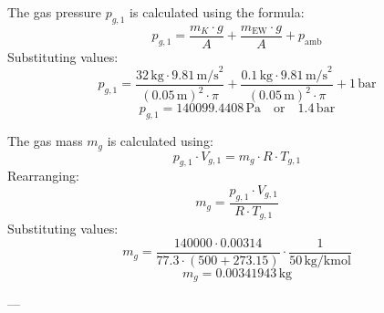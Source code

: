 The gas pressure \( p_{g,1} \) is calculated using the formula:  
\[
p_{g,1} = \frac{m_K \cdot g}{A} + \frac{m_{\text{EW}} \cdot g}{A} + p_{\text{amb}}
\]  
Substituting values:  
\[
p_{g,1} = \frac{32 \, \text{kg} \cdot 9.81 \, \text{m/s}^2}{(0.05 \, \text{m})^2 \cdot \pi} + \frac{0.1 \, \text{kg} \cdot 9.81 \, \text{m/s}^2}{(0.05 \, \text{m})^2 \cdot \pi} + 1 \, \text{bar}
\]  
\[
p_{g,1} = 140099.4408 \, \text{Pa} \quad \text{or} \quad 1.4 \, \text{bar}
\]  

The gas mass \( m_g \) is calculated using:  
\[
p_{g,1} \cdot V_{g,1} = m_g \cdot R \cdot T_{g,1}
\]  
Rearranging:  
\[
m_g = \frac{p_{g,1} \cdot V_{g,1}}{R \cdot T_{g,1}}
\]  
Substituting values:  
\[
m_g = \frac{140000 \cdot 0.00314}{77.3 \cdot (500 + 273.15)} \cdot \frac{1}{50 \, \text{kg/kmol}}
\]  
\[
m_g = 0.00341943 \, \text{kg}
\]  

---